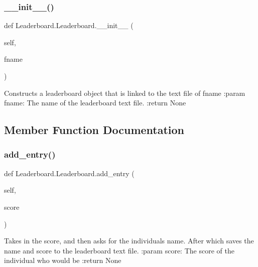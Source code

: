 \subsubsection{\texorpdfstring{\+\_\+\+\_\+init\+\_\+\+\_\+()}{\_\_init\_\_()}}
{\footnotesize\ttfamily def Leaderboard.\+Leaderboard.\+\_\+\+\_\+init\+\_\+\+\_\+ (\begin{DoxyParamCaption}\item[{}]{self,  }\item[{}]{fname }\end{DoxyParamCaption})}

\begin{DoxyVerb}Constructs a leaderboard object that is linked to the text file of fname
:param fname: The name of the leaderboard text file.
:return None
\end{DoxyVerb}
 

\subsection{Member Function Documentation}
\mbox{\label{class_leaderboard_1_1_leaderboard_a5843c7b6939076a386b2636f85e6596c}} 
\subsubsection{\texorpdfstring{add\+\_\+entry()}{add\_entry()}}
{\footnotesize\ttfamily def Leaderboard.\+Leaderboard.\+add\+\_\+entry (\begin{DoxyParamCaption}\item[{}]{self,  }\item[{}]{score }\end{DoxyParamCaption})}

\begin{DoxyVerb}Takes in the score, and then asks for the individuals name.  After which saves the name and score to the leaderboard text file.
:param score: The score of the individual who would be
:return None
\end{DoxyVerb}
 \mbox{\label{class_leaderboard_1_1_leaderboard_a0e63ac70057d6e900598b04492b3634c}} 
